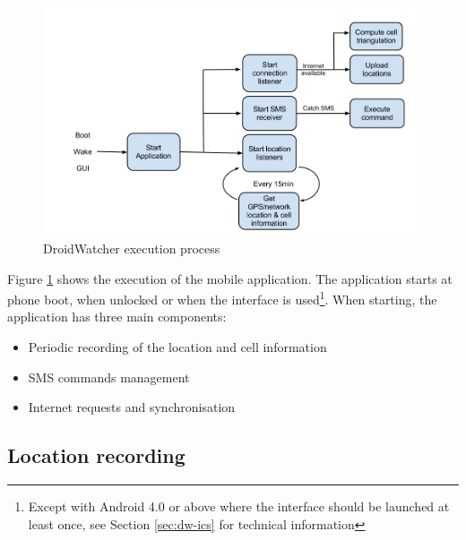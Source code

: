 \begin{figure}[h]
  \centering
  \includegraphics[width=\textwidth]{images/dw-schema.png}
  \caption{DroidWatcher execution process}
  \label{fig:dw-schema}
\end{figure}

Figure \ref{fig:dw-schema} shows the execution of the mobile application.
The application starts at phone boot, when unlocked or when the interface is used\footnote{Except with Android 4.0 or above where the interface should be launched at least once, see Section \ref{sec:dw-ics} for technical information}.
When starting, the application has three main components:
\begin{itemize}
\item Periodic recording of the location and cell information
\item SMS commands management
\item Internet requests and synchronisation%
\end{itemize}


\subsection{Location recording}

